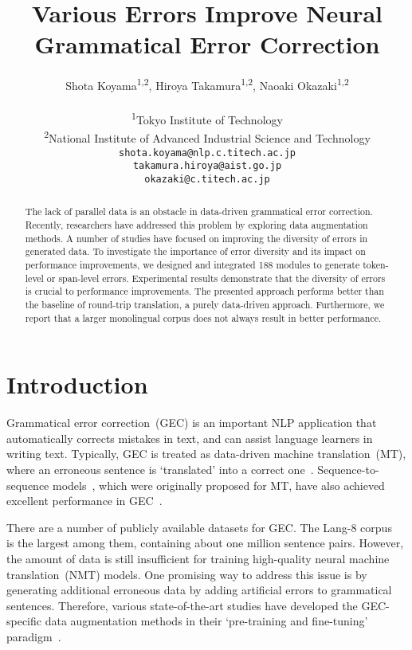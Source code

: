 \documentclass[11pt]{article}
\title{Various Errors Improve Neural Grammatical Error Correction}
\author{
    Shota Koyama\textsuperscript{1,2},
    Hiroya Takamura\textsuperscript{1,2},
    Naoaki Okazaki\textsuperscript{1,2} \\
        \\
    \textsuperscript{1}Tokyo Institute of Technology \\
    \textsuperscript{2}National Institute of Advanced Industrial Science and Technology \\
    \texttt{shota.koyama@nlp.c.titech.ac.jp} \\
    \texttt{takamura.hiroya@aist.go.jp} \\
    \texttt{okazaki@c.titech.ac.jp}}
\date{}
\begin{document}
\maketitle
\begin{abstract}
    The lack of parallel data is an obstacle in data-driven grammatical error correction.
    Recently, researchers have addressed this problem by exploring data augmentation methods.
    A number of studies have focused on improving the diversity of errors in generated data.
    To investigate the importance of error diversity and its impact on performance improvements,
    we designed and integrated 188 modules to generate token-level or span-level errors.
    Experimental results demonstrate that
    the diversity of errors is crucial to performance improvements.
    The presented approach performs better than the baseline of round-trip translation, a purely data-driven approach.
    Furthermore, we report that a larger monolingual corpus does not always result in better performance.
\end{abstract}

\section{Introduction}
\label{sec:introduction}

Grammatical error correction~(GEC) is an important NLP application that automatically corrects mistakes in text, and can assist language learners in writing text.
Typically, GEC is treated as data-driven machine translation~(MT), where an erroneous sentence is `translated' into a correct one~\citep{brockett-etal-2006-correcting}.
Sequence-to-sequence models~\citep{NIPS2014_a14ac55a}, which were originally proposed for MT, have also achieved excellent performance in GEC~\citep{junczys-dowmunt-etal-2018-approaching}.

There are a number of publicly available datasets for GEC.
The Lang-8 corpus~\citep{mizumoto-etal-2012-effect} is the largest among them, containing about one million sentence pairs.
However, the amount of data is still insufficient for training high-quality neural machine translation~(NMT) models.
One promising way to address this issue is by generating additional erroneous data by adding artificial errors to grammatical sentences.
Therefore, various state-of-the-art studies have developed the GEC-specific data augmentation methods
in their `pre-training and fine-tuning' paradigm~\citep{lichtarge-etal-2019-corpora,grundkiewicz-etal-2019-neural,kiyono-etal-2019-empirical}.
\end{document}
